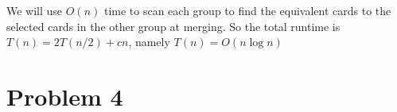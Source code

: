 \documentclass[letter,12pt]{article}
\begin{document}
We will use $O(n)$ time to scan each group to find the equivalent cards
to the selected cards in the other group at merging. So the total runtime
is $T(n) = 2T(n/2) + cn$, namely $T(n)= O(n\log n)$

\section*{Problem 4}
\end{document}
